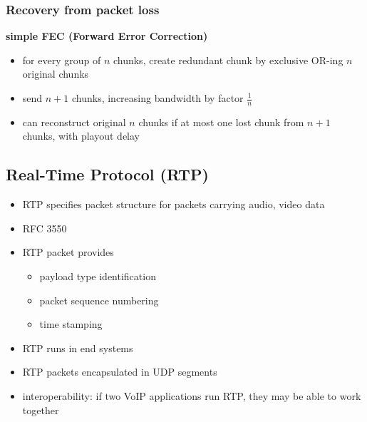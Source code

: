 \subsubsection{Recovery from packet loss}
\textbf{simple FEC (Forward Error Correction)}
\begin{itemize}
	\item for every group of $n$ chunks, create redundant chunk by exclusive OR-ing $n$ original chunks
	\item send $n+1$ chunks, increasing bandwidth by factor $\frac{1}{n}$
	\item can reconstruct original $n$ chunks if at most one lost chunk from $n+1$ chunks, with playout delay
\end{itemize}

\subsection{Real-Time Protocol (RTP)}\label{sec:rtp}
\begin{itemize}
	\item RTP specifies packet structure for packets carrying audio, video data
	\item RFC 3550
	\item RTP packet provides
	\begin{itemize}
		\item payload type identification
		\item packet sequence numbering
		\item time stamping
	\end{itemize}
	\item RTP runs in end systems
	\item RTP packets encapsulated in UDP segments
	\item interoperability: if two VoIP applications run RTP, they may be able to work together
\end{itemize}
